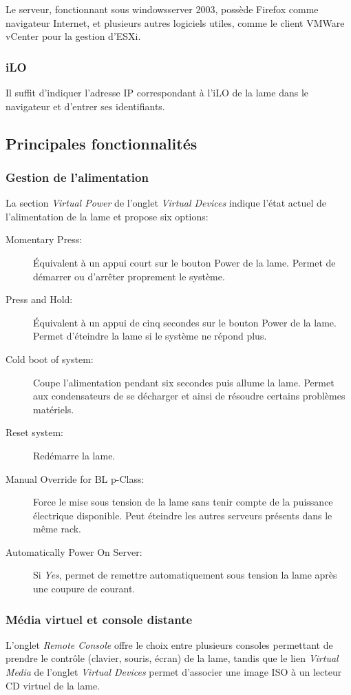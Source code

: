 \documentclass[a4paper,oneside]{report}
\begin{document}
Le serveur, fonctionnant sous \gls{windowsserver} 2003, possède Firefox comme navigateur Internet, et plusieurs autres logiciels utiles, comme le client VMWare vCenter pour la gestion d'ESXi.

\subsubsection{iLO}
Il suffit d'indiquer l'adresse IP correspondant à l'iLO de la lame dans le navigateur et d'entrer ses identifiants.

\subsection{Principales fonctionnalités}
\subsubsection{Gestion de l'alimentation}
La section \emph{Virtual Power} de l'onglet \emph{Virtual Devices} indique l'état actuel de l'alimentation de la lame et propose six options:
\begin{description}
\item[Momentary Press:] Équivalent à un appui court sur le bouton Power de la lame.
Permet de démarrer ou d'arrêter proprement le système.
\item[Press and Hold:] Équivalent à un appui de cinq secondes sur le bouton Power de la lame.
Permet d'éteindre la lame si le système ne répond plus.
\item[Cold boot of system:] Coupe l'alimentation pendant six secondes puis allume la lame.
Permet aux condensateurs de se décharger et ainsi de résoudre certains problèmes matériels.
\item[Reset system:] Redémarre la lame.
\item[Manual Override for BL p-Class:] Force le mise sous tension de la lame sans tenir compte de la puissance électrique disponible.
Peut éteindre les autres serveurs présents dans le même rack.
\item[Automatically Power On Server:] Si \emph{Yes}, permet de remettre automatiquement sous tension la lame après une coupure de courant.
\end{description}

\subsubsection{Média virtuel et console distante}
L'onglet \emph{Remote Console} offre le choix entre plusieurs consoles permettant de prendre le contrôle (clavier, souris, écran) de la lame, tandis que le lien \emph{Virtual Media} de l'onglet \emph{Virtual Devices} permet d'associer une image ISO à un lecteur CD virtuel de la lame.
\end{document}
